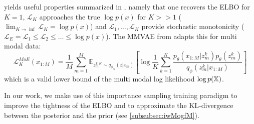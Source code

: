  yields useful properties summarized in \parencite{nowozin_debiasing_2018}, namely that one recovers the ELBO for $K=1$, $\mathcal{L}_K$ approaches the true $\log p(x)$ for $K>>1$ ($\lim _{K \rightarrow \inf} \mathcal{L}_K = \log p(x)$) and $\mathcal{L}_1, \ldots, \mathcal{L}_K$ provide stochastic monotonicity ($\mathcal{L}_E = \mathcal{L}_1 \leq \mathcal{L}_2 \leq \ldots \leq \log p(x)$).
The MMVAE from \parencite{shi2019variational} adapts this for multi modal data:
\begin{equation}
    \label{eq:iwelbommvae}
    \mathcal{L}^{MoE}_K(x_{1:M}) =
    \frac{1}{M} \sum _{m=1} ^M \mathbb{E}_{z_m^{1:K} \sim q_{\phi_m}(z|x_m)}\left[ \log \frac{1}{K} \sum ^K _{k=1} \frac{p_{\theta}(x_{1:M}|z_m^k)p_{\theta}(z^k_m)}{q_{\phi}(z_m^k| x_{1:M})} \right]
\end{equation}
which is a valid lower bound of the multi modal log likelihood $\log p(\mathbb{X})$.

In our work, we make use of this importance sampling training paradigm to improve the tightness of the ELBO and to approximate the KL-divergence between the posterior and the prior (see \cref{subsubsec:iwMogfM}).

